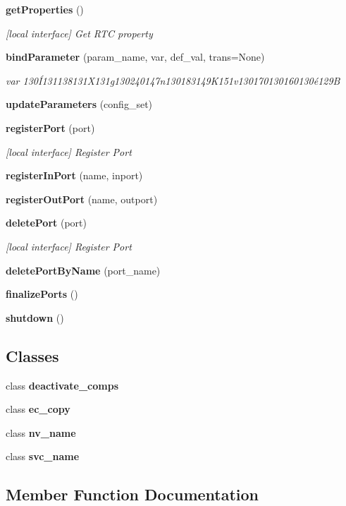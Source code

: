 \begin{CompactItemize}
{\bf get\-Properties} ()
\begin{CompactList}\small\item\em [local interface] Get RTC property \item\end{CompactList}\item 
{\bf bind\-Parameter} (param\_\-name, var, def\_\-val, trans=None)
\begin{CompactList}\small\item\em var 130\'{I}131138131X131g130240147n130183149K151v130170130160130\'{e}129B \item\end{CompactList}\item 
{\bf update\-Parameters} (config\_\-set)
\item 
{\bf register\-Port} (port)
\begin{CompactList}\small\item\em [local interface] Register Port \item\end{CompactList}\item 
{\bf register\-In\-Port} (name, inport)
\item 
{\bf register\-Out\-Port} (name, outport)
\item 
{\bf delete\-Port} (port)
\begin{CompactList}\small\item\em [local interface] Register Port \item\end{CompactList}\item 
{\bf delete\-Port\-By\-Name} (port\_\-name)
\item 
{\bf finalize\-Ports} ()
\item 
{\bf shutdown} ()
\end{CompactItemize}
\subsection*{Classes}
\begin{CompactItemize}
\item 
class {\bf deactivate\_\-comps}
\item 
class {\bf ec\_\-copy}
\item 
class {\bf nv\_\-name}
\item 
class {\bf svc\_\-name}
\end{CompactItemize}


\subsection{Member Function Documentation}
